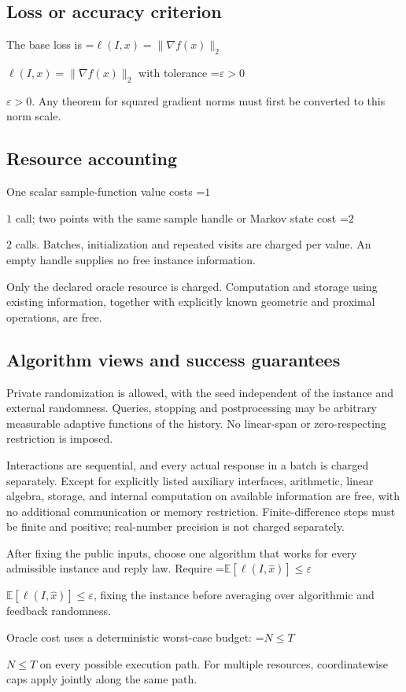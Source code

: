 \documentclass[10pt,a4paper]{article}
\newcommand{\AtlasMath}[1]{\par\begingroup\centering\setbox0=\hbox{$\displaystyle #1$}\ifdim\wd0>1.4\linewidth\typeout{ATLAS WIDE FORMULA: \the\wd0}\fi\ifdim\wd0>\linewidth\resizebox{\linewidth}{!}{\box0}\else\box0\fi\par\endgroup}
\newcommand{\AtlasInlineMath}[1]{\begingroup\setbox0=\hbox{$#1$}\ifdim\wd0>.4\linewidth\endgroup\AtlasMath{#1}\else\endgroup$#1$\fi}
\begin{document}
\subsection{Loss or accuracy criterion}
The base loss is \AtlasInlineMath{\ell(I,x)=\|\nabla f(x)\|_2} with tolerance \AtlasInlineMath{\varepsilon>0}. Any theorem for squared gradient norms must first be converted to this norm scale.

\subsection{Resource accounting}
One scalar sample-function value costs \AtlasInlineMath{1} call; two points with the same sample handle or Markov state cost \AtlasInlineMath{2} calls. Batches, initialization and repeated visits are charged per value. An empty handle supplies no free instance information.

Only the declared oracle resource is charged. Computation and storage using existing information, together with explicitly known geometric and proximal operations, are free.

\subsection{Algorithm views and success guarantees}
Private randomization is allowed, with the seed independent of the instance and external randomness. Queries, stopping and postprocessing may be arbitrary measurable adaptive functions of the history. No linear-span or zero-respecting restriction is imposed.

Interactions are sequential, and every actual response in a batch is charged separately. Except for explicitly listed auxiliary interfaces, arithmetic, linear algebra, storage, and internal computation on available information are free, with no additional communication or memory restriction. Finite-difference steps must be finite and positive; real-number precision is not charged separately.

After fixing the public inputs, choose one algorithm that works for every admissible instance and reply law. Require \AtlasInlineMath{\mathbb{E}[\ell(I,\widehat{x})]\le \varepsilon}, fixing the instance before averaging over algorithmic and feedback randomness.

Oracle cost uses a deterministic worst-case budget: \AtlasInlineMath{N\le T} on every possible execution path. For multiple resources, coordinatewise caps apply jointly along the same path.
\end{document}
